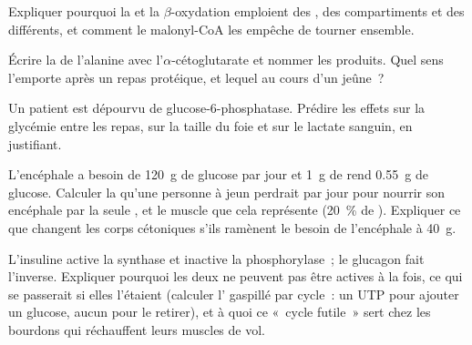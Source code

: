 \begin{exercise}[$\star\star$]\label{exo:b1:biosyntheses-integration:7}
Expliquer pourquoi la  et la $\beta$-oxydation
emploient des , des compartiments et des  différents, et
comment le malonyl-CoA les empêche de tourner ensemble.
\end{exercise}

\begin{exercise}[$\star\star$]\label{exo:b1:biosyntheses-integration:8}
Écrire la  de l'alanine avec l'$\alpha$-cétoglutarate et
nommer les produits. Quel sens l'emporte après un repas protéique, et
lequel au cours d'un jeûne~?
\end{exercise}

\begin{exercise}[$\star\star$]\label{exo:b1:biosyntheses-integration:9}
Un patient est dépourvu de glucose-6-phosphatase. Prédire les effets sur
la glycémie entre les repas, sur la taille du foie et sur le lactate
sanguin, en justifiant.
\end{exercise}

\begin{exercise}[$\star\star\star$]\label{exo:b1:biosyntheses-integration:10}
L'encéphale a besoin de \qty{120}{g} de glucose par jour et \qty{1}{g}
de  rend \qty{0.55}{g} de glucose. Calculer la  qu'une
personne à jeun perdrait par jour pour nourrir son encéphale par la
seule , et le muscle que cela représente (\qty{20}{\%} de
). Expliquer ce que changent les corps cétoniques s'ils
ramènent le besoin de l'encéphale à \qty{40}{g}.
\end{exercise}

\begin{exercise}[$\star\star\star$]\label{exo:b1:biosyntheses-integration:11}
L'insuline active la  synthase et inactive la 
phosphorylase~; le glucagon fait l'inverse. Expliquer pourquoi les deux
ne peuvent pas être actives à la fois, ce qui se passerait si elles
l'étaient (calculer l' gaspillé par cycle~: un UTP pour ajouter un
glucose, aucun pour le retirer), et à quoi ce «~cycle futile~» sert
chez les bourdons qui réchauffent leurs muscles de vol.
\end{exercise}

